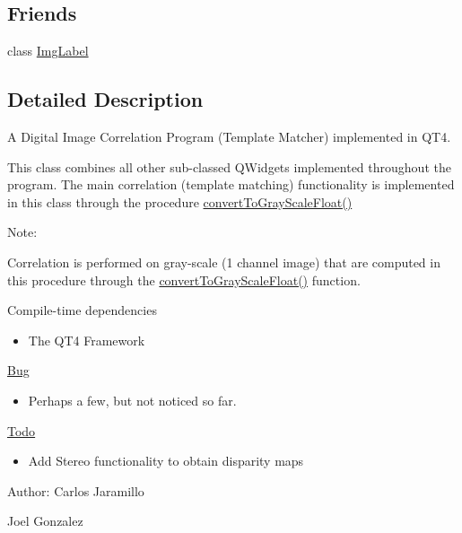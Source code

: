 \subsection*{Friends}
\begin{CompactItemize}
\item 
\hypertarget{classQcorr_5b4b2caf4c596b601dd096785e4a32b9}{
class \hyperlink{classQcorr_5b4b2caf4c596b601dd096785e4a32b9}{ImgLabel}}
\label{classQcorr_5b4b2caf4c596b601dd096785e4a32b9}

\end{CompactItemize}


\subsection{Detailed Description}
A Digital Image Correlation Program (Template Matcher) implemented in QT4. 

This class combines all other sub-classed QWidgets implemented throughout the program. The main correlation (template matching) functionality is implemented in this class through the procedure \hyperlink{classQcorr_d1b26ace597c0c4a0f64a0bd9576d4fc}{convertToGrayScaleFloat()}

\begin{Desc}
\item[Note:]\end{Desc}
Correlation is performed on gray-scale (1 channel image) that are computed in this procedure through the \hyperlink{classQcorr_d1b26ace597c0c4a0f64a0bd9576d4fc}{convertToGrayScaleFloat()} function.

\begin{Desc}
\item[Compile-time dependencies]\end{Desc}
\begin{itemize}
\item The QT4 Framework\end{itemize}


\begin{Desc}
\item[\hyperlink{bug__bug000001}{Bug}]\begin{itemize}
\item Perhaps a few, but not noticed so far.\end{itemize}
\end{Desc}
\begin{Desc}
\item[\hyperlink{todo__todo000001}{Todo}]\begin{itemize}
\item Add Stereo functionality to obtain disparity maps\end{itemize}
\end{Desc}
\begin{Desc}
\item[Author:]Carlos Jaramillo 

Joel Gonzalez \end{Desc}


